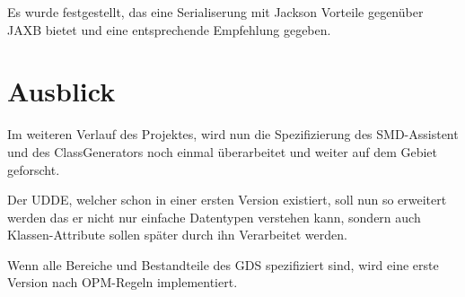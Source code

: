 Es wurde festgestellt, das eine Serialiserung mit Jackson Vorteile gegen\"uber JAXB bietet und eine entsprechende Empfehlung gegeben. 

\section{Ausblick}
Im weiteren Verlauf des Projektes, wird nun die Spezifizierung des SMD-Assistent und des ClassGenerators noch einmal \"uberarbeitet und weiter auf dem Gebiet geforscht. 

Der \ac{UDDE}, welcher schon in einer ersten Version existiert, soll nun so erweitert werden das er nicht nur einfache Datentypen verstehen kann, sondern auch Klassen-Attribute sollen sp\"ater durch ihn Verarbeitet werden.

Wenn alle Bereiche und Bestandteile des \ac{GDS} spezifiziert sind, wird eine erste Version nach \ac{OPM}-Regeln implementiert.